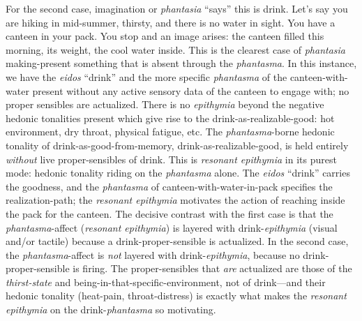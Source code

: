 For the second case, imagination or \textit{phantasia} ``says'' this is drink. Let's say you are hiking in mid-summer, thirsty, and there is no water in sight. You have a canteen in your pack. You stop and an image arises: the canteen filled this morning, its weight, the cool water inside. This is the clearest case of \textit{phantasia} making-present something that is absent through the \textit{phantasma}. In this instance, we have the \textit{eidos} ``drink'' and the more specific \textit{phantasma} of the canteen-with-water present without any active sensory data of the canteen to engage with; no proper sensibles are actualized. There is no \textit{epithymia} beyond the negative hedonic tonalities present which give rise to the drink-as-realizable-good: hot environment, dry throat, physical fatigue, etc. The \textit{phantasma}-borne hedonic tonality of drink-as-good-from-memory, drink-as-realizable-good, is held entirely \textit{without} live proper-sensibles of drink. This is \textit{resonant epithymia} in its purest mode: hedonic tonality riding on the \textit{phantasma} alone. The \textit{eidos} ``drink'' carries the goodness, and the \textit{phantasma} of canteen-with-water-in-pack specifies the realization-path; the \textit{resonant epithymia} motivates the action of reaching inside the pack for the canteen. The decisive contrast with the first case is that the \textit{phantasma}-affect (\textit{resonant epithymia}) is layered with drink-\textit{epithymia} (visual and/or tactile) because a drink-proper-sensible is actualized. In the second case, the \textit{phantasma}-affect is \textit{not} layered with drink-\textit{epithymia}, because no drink-proper-sensible is firing. The proper-sensibles that \textit{are} actualized are those of the \textit{thirst-state} and being-in-that-specific-environment, not of drink---and their hedonic tonality (heat-pain, throat-distress) is exactly what makes the \textit{resonant epithymia} on the drink-\textit{phantasma} so motivating. 

